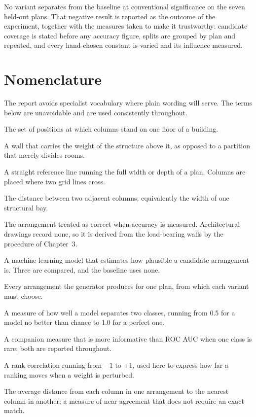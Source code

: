 No variant separates from the baseline at conventional significance on the
seven held-out plans. That negative result is reported as the outcome of
the experiment, together with the measures taken to make it trustworthy:
candidate coverage is stated before any accuracy figure, splits are
grouped by plan and repeated, and every hand-chosen constant is varied and
its influence measured.

\cleardoublepage
\tableofcontents
\cleardoublepage
\listoftables
{}
\cleardoublepage
\listoffigures
{}

\chapter*{Nomenclature}

The report avoids specialist vocabulary where plain wording will serve.
The terms below are unavoidable and are used consistently throughout.

\begin{description}[style=nextline,leftmargin=3.2cm,labelwidth=3cm]
\item[Column arrangement] The set of positions at which columns stand on
one floor of a building.
\item[Load-bearing wall] A wall that carries the weight of the structure
above it, as opposed to a partition that merely divides rooms.
\item[Grid line] A straight reference line running the full width or depth
of a plan. Columns are placed where two grid lines cross.
\item[Span] The distance between two adjacent columns; equivalently the
width of one structural bay.
\item[Label, or ground truth] The arrangement treated as correct when
accuracy is measured. Architectural drawings record none, so it is derived
from the load-bearing walls by the procedure of Chapter~3.
\item[Judge] A machine-learning model that estimates how plausible a
candidate arrangement is. Three are compared, and the baseline uses none.
\item[Candidate set] Every arrangement the generator produces for one
plan, from which each variant must choose.
\item[ROC AUC] A measure of how well a model separates two classes,
running from 0.5 for a model no better than chance to 1.0 for a perfect
one.
\item[PR AUC] A companion measure that is more informative than ROC AUC
when one class is rare; both are reported throughout.
\item[Kendall's $\tau$] A rank correlation running from $-1$ to $+1$, used
here to express how far a ranking moves when a weight is perturbed.
\item[Chamfer distance] The average distance from each column in one
arrangement to the nearest column in another; a measure of near-agreement
that does not require an exact match.
\end{description}

\cleardoublepage
{}
